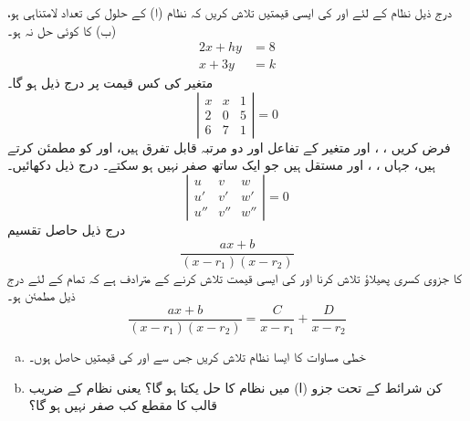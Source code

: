 درج ذیل نظام کے لئے  اور  کی  ایسی  قیمتیں تلاش کریں کہ نظام (ا)   کے حلول   کی تعداد لامتناہی ہو، (ب)  کا  کوئی حل نہ ہو۔
\begin{align*}
2x+hy&=8\\
x+3y&=k
\end{align*}
متغیر  کی کس قیمت پر درج ذیل ہو گا۔
\[
\left |
\begin{array}{rrr}
x&x&1\\
2&0&5\\
6&7&1
\end{array}\right  |=0
\]
فرض کریں ، ، اور    متغیر  کے تفاعل اور دو مرتبہ قابل تفرق ہیں،   اور   کو مطمئن کرتے ہیں، جہاں ، ، اور   مستقل ہیں جو ایک ساتھ صفر نہیں ہو سکتے۔ درج ذیل دکھائیں۔
\[
\left |
\begin{array}{lll}
u&v&w\\
u'&v'&w'\\
u''&v''&w''
\end{array}
\right |=0
\]
\quad 
درج ذیل حاصل تقسیم
\[\frac{ax+b}{(x-r_1)(x-r_2)}\]
  کا جزوی کسری پھیلاؤ  تلاش کرنا   اور  کی ایسی قیمت تلاش کرنے کے مترادف ہے کہ تمام  کے لئے درج ذیل مطمئن ہو۔
\[\frac{ax+b}{(x-r_1)(x-r_2)}=\frac{C}{x-r_1}+\frac{D}{x-r_2}\]

\begin{enumerate}[a.]
\item
خطی مساوات کا  ایسا نظام تلاش کریں   جس سے  اور   کی قیمتیں حاصل ہوں۔
\item
کن شرائط کے تحت جزو (ا) میں نظام  کا حل یکتا ہو گا؟ یعنی  نظام کے ضریب  قالب  کا مقطع  کب صفر نہیں ہو گا؟
\end{enumerate}
